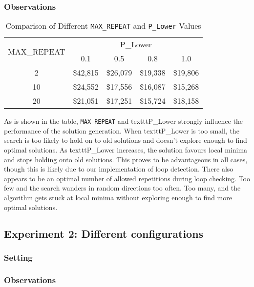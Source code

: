 \documentclass[11pt]{article}
\begin{document}
\subsubsection{Observations}


\begin{table}
	\centering
	\caption{Comparison of Different \texttt{MAX\_REPEAT} and \texttt{P\_Lower} Values}
	\begin{tabular}{|c|c|c|c|c|}
		\hline
		\multirow{2}{*}{MAX\_REPEAT} & \multicolumn{4}{c|}{P\_Lower} \\ \cline{2-5} 
		& 0.1 & 0.5 & 0.8 & 1.0 \\ \hline
		2 & \$42,815 & \$26,079 & \$19,338 & \$19,806 \\ \hline
		10 & \$24,552 & \$17,556 & \$16,087 & \$15,268 \\ \hline
		20 & \$21,051 & \$17,251 & \$15,724 & \$18,158 \\ \hline
	\end{tabular}
\end{table}


As is shown in the table, \texttt{MAX\_REPEAT} and texttt{P\_Lower} strongly influence the performance of the solution generation. When texttt{P\_Lower} is too small, the search is too likely to hold on to old solutions and doesn't explore enough to find optimal solutions. As texttt{P\_Lower} increases, the solution favours local minima and stops holding onto old solutions. This proves to be advantageous in all cases, though this is likely due to our implementation of loop detection. There also appears to be an optimal number of allowed repetitions during loop checking. Too few and the search wanders in random directions too often. Too many, and the algorithm gets stuck at local minima without exploring enough to find more optimal solutions.

\subsection{Experiment 2: Different configurations}

\subsubsection{Setting}

\subsubsection{Observations}
\end{document}
